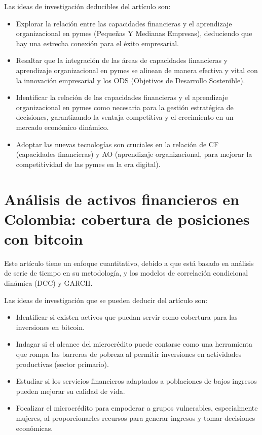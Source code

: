 \documentclass[conference]{IEEEtran}
\begin{document}
Las ideas de investigación deducibles del artículo son:

\begin{itemize}
	\item Explorar la relación entre las capacidades financieras y el aprendizaje
	      organizacional en pymes (Pequeñas Y Medianas Empresas), deduciendo que hay una
	      estrecha conexión para el éxito empresarial.

	\item Resaltar que la integración de las áreas de capacidades financieras y
	      aprendizaje organizacional en pymes se alinean de manera efectiva y vital con
	      la innovación empresarial y los ODS (Objetivos de Desarrollo Sostenible).

	\item Identificar la relación de las capacidades financieras y el aprendizaje
	      organizacional en pymes como necesaria para la gestión estratégica de
	      decisiones, garantizando la ventaja competitiva y el crecimiento en un mercado
	      económico dinámico.

	\item Adoptar las nuevas tecnologías son cruciales en la relación de CF (capacidades
	      financieras) y AO (aprendizaje organizacional, para mejorar la competitividad
	      de las pymes en la era digital).
\end{itemize}

\section*{Análisis de activos financieros en Colombia: cobertura de posiciones con bitcoin}

Este artículo tiene un enfoque cuantitativo, debido a que está basado en
análisis de serie de tiempo en su metodología, y los modelos de correlación
condicional dinámica (DCC) y GARCH\@{}.

Las ideas de investigación que se pueden deducir del artículo son:

\begin{itemize}
	\item Identificar si existen activos que puedan servir como cobertura para las
	      inversiones en bitcoin.

	\item Indagar si el alcance del microcrédito puede contarse como una herramienta que
	      rompa las barreras de pobreza al permitir inversiones en actividades
	      productivas (sector primario).

	\item Estudiar si los servicios financieros adaptados a poblaciones de bajos ingresos
	      pueden mejorar su calidad de vida.

	\item Focalizar el microcrédito para empoderar a grupos vulnerables, especialmente
	      mujeres, al proporcionarles recursos para generar ingresos y tomar decisiones
	      económicas.

\end{itemize}


\end{document}
